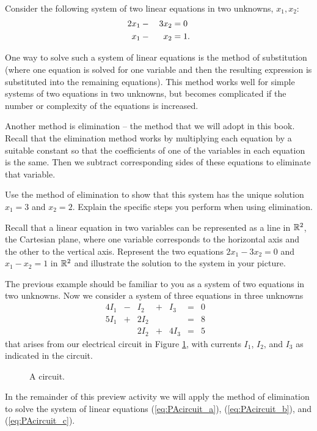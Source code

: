 \begin{pa} \label{pa:1_a} ~
\be
\item \label{ex:system_1} Consider the following system of two linear equations in two unknowns, $x_1, x_2$: 
\begin{alignat}{4}
2x_1	&{}-{}	&3x_2 	&= 0  \notag \\%
x_1 	&{}-{} 	&x_2		&= 1. \notag %
\end{alignat}


One way to solve such a system of linear equations is the method of substitution (where one equation is solved for one variable and then the resulting expression is substituted into the remaining equations). This method works well for simple systems of two equations in two unknowns, but becomes complicated if the number or complexity of the equations is increased. 

Another method is elimination -- the method that we will adopt in this book. Recall that the elimination method works by multiplying each equation by a suitable constant so that the coefficients of one of the variables in each equation is the same. Then we subtract corresponding sides of these equations to eliminate that variable. 

Use the method of elimination to show that this system has the unique solution $x_1=3$ and $x_2=2$. Explain the specific steps you perform when using elimination. 

\item Recall that a linear equation in two variables can be represented as a line in $\mathbb{R}^2$, the Cartesian plane, where one variable corresponds to the horizontal axis and the other to the vertical axis. Represent the two equations $2x_1 -3x_2 = 0$ and $x_1 - x_2= 1$ in $\mathbb{R}^2$ and illustrate the solution to the system in your picture.

\item The previous example should be familiar to you as a system of two equations in two unknowns. Now we consider a system of three equations in three unknowns 
\begin{alignat}{4}
{}I_1 	&{}-{} 	&{}I_2	&{}+{}	&{}I_3 	&{}={} 	&0&{}  \label{eq:PAcircuit_a} \\
{5}I_1 	&{}+{}	&{2}I_2 	&{} 		&{} 		&{}={}	&8&{} \label{eq:PAcircuit_b} \\
{}		&{} 	 	&{2}I_2 	&{}+{}	& {4}I_3	&{}={}	&5&{} \label{eq:PAcircuit_c}
\end{alignat}
that arises from our electrical circuit in Figure \ref{F:circuit1}, with currents $I_1$, $I_2$, and $I_3$ as indicated in the circuit. 
\begin{figure}[h]
\begin{center}
\end{center}
\caption{A circuit.}
\label{F:circuit1}
\end{figure}
In the remainder of this preview activity we will apply the method of elimination to solve the system of linear equations (\ref{eq:PAcircuit_a}), (\ref{eq:PAcircuit_b}), and (\ref{eq:PAcircuit_c}). 


\end{pa}
